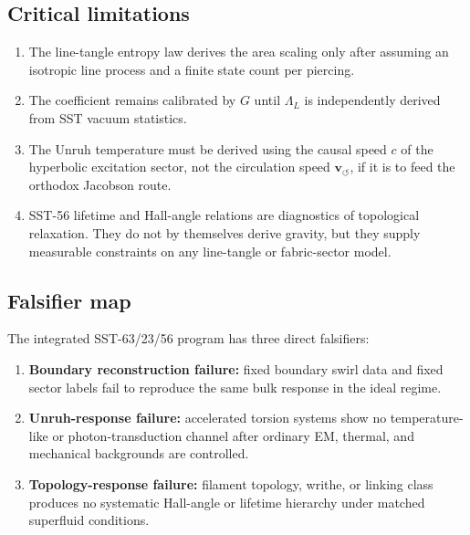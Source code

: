 \documentclass[11pt]{article}
\begin{document}
    \subsection{Critical limitations}

        \begin{enumerate}
            \item The line-tangle entropy law derives the area scaling only
            after assuming an isotropic line process and a finite state count per
            piercing.
            \item The coefficient remains calibrated by \(G\) until
            \(\Lambda_L\) is independently derived from SST vacuum statistics.
            \item The Unruh temperature must be derived using the causal speed
            \(c\) of the hyperbolic excitation sector, not the circulation speed
            \(\mathbf{v}_{\!\boldsymbol{\circlearrowleft}}\), if it is to feed
            the orthodox Jacobson route.
            \item SST-56 lifetime and Hall-angle relations are diagnostics of
            topological relaxation.  They do not by themselves derive gravity,
            but they supply measurable constraints on any line-tangle or
            fabric-sector model.
        \end{enumerate}

    \subsection{Falsifier map}

        The integrated SST-63/23/56 program has three direct falsifiers:
        \begin{enumerate}
            \item \textbf{Boundary reconstruction failure:} fixed boundary swirl
            data and fixed sector labels fail to reproduce the same bulk
            response in the ideal regime.
            \item \textbf{Unruh-response failure:} accelerated torsion systems
            show no temperature-like or photon-transduction channel after
            ordinary EM, thermal, and mechanical backgrounds are controlled.
            \item \textbf{Topology-response failure:} filament topology, writhe,
            or linking class produces no systematic Hall-angle or lifetime
            hierarchy under matched superfluid conditions.
        \end{enumerate}
\end{document}
